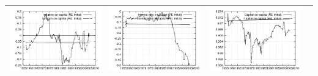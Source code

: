 \documentclass{beamer}
\begin{document}
{\begin{tabular}{|cccc|}
  \includegraphics[scale=0.17]{plots2/cap_initest_Inflation_on_capital.png} &
  \includegraphics[scale=0.17]{plots2/cap_initest_Interest_rate_on_capital.png} & 
  \includegraphics[scale=0.17]{plots2/cap_initest_Capital_on_capital.png} \\ \hline
  \end{tabular}
}
\end{document}
